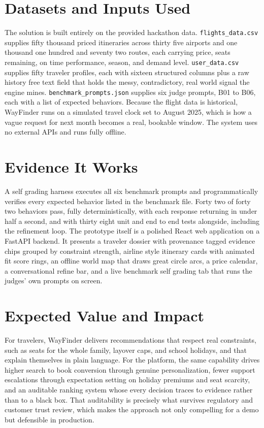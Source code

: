 \documentclass[11pt,a4paper]{article}
\begin{document}
\section{Datasets and Inputs Used}
The solution is built entirely on the provided hackathon data. \texttt{flights\_data.csv}
supplies fifty thousand priced itineraries across thirty five airports and one thousand one
hundred and seventy two routes, each carrying price, seats remaining, on time performance,
season, and demand level. \texttt{user\_data.csv} supplies fifty traveler profiles, each with
sixteen structured columns plus a raw history free text field that holds the messy, contradictory,
real world signal the engine mines. \texttt{benchmark\_prompts.json} supplies six judge prompts,
B01 to B06, each with a list of expected behaviors. Because the flight data is historical,
WayFinder runs on a simulated travel clock set to August 2025, which is how a vague request for
next month becomes a real, bookable window. The system uses no external APIs and runs fully
offline.

\section{Evidence It Works}
A self grading harness executes all six benchmark prompts and programmatically verifies every
expected behavior listed in the benchmark file. Forty two of forty two behaviors pass, fully
deterministically, with each response returning in under half a second, and with thirty eight
unit and end to end tests alongside, including the refinement loop. The prototype itself is a
polished React web application on a FastAPI backend. It presents a traveler dossier with
provenance tagged evidence chips grouped by constraint strength, airline style itinerary cards
with animated fit score rings, an offline world map that draws great circle arcs, a price
calendar, a conversational refine bar, and a live benchmark self grading tab that runs the judges'
own prompts on screen.

\section{Expected Value and Impact}
For travelers, WayFinder delivers recommendations that respect real constraints, such as seats
for the whole family, layover caps, and school holidays, and that explain themselves in plain
language. For the platform, the same capability drives higher search to book conversion through
genuine personalization, fewer support escalations through expectation setting on holiday premiums
and seat scarcity, and an auditable ranking system whose every decision traces to evidence rather
than to a black box. That auditability is precisely what survives regulatory and customer trust
review, which makes the approach not only compelling for a demo but defensible in production.
\end{document}
